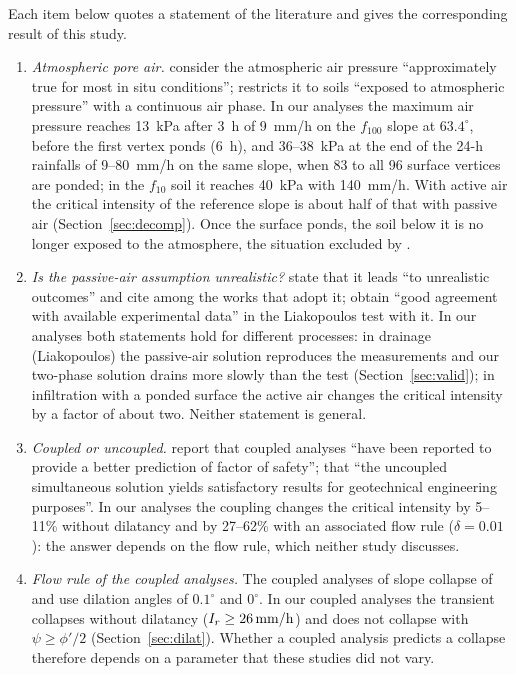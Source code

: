 Each item below quotes a statement of the literature and gives the corresponding result of this study.
\begin{enumerate}
\item \emph{Atmospheric pore air.} \citet[p.~811]{sheng2008} consider the atmospheric air pressure ``approximately
true for most in situ conditions''; \citet[p.~292]{fredlund2006} restricts it to soils ``exposed to atmospheric
pressure'' with a continuous air phase. In our analyses the maximum air pressure reaches 13~kPa after 3~h of
9~mm/h on the $f_{100}$ slope at $63.4^\circ$, before the first vertex ponds (6~h), and 36--38~kPa at the end of the
24-h rainfalls of 9--80~mm/h on the same slope, when 83 to all 96 surface vertices are ponded; in the $f_{10}$ soil it
reaches 40~kPa
with 140~mm/h. With active air the critical intensity of the reference slope is about half of that with passive air
(Section~\ref{sec:decomp}). Once the surface ponds, the soil below it is no longer exposed to the atmosphere, the
situation excluded by \citet{fredlund2006}.

\item \emph{Is the passive-air assumption unrealistic?} \citet[p.~2]{khoei2021} state that it leads ``to unrealistic
outcomes'' and cite \citet{callari2009} among the works that adopt it; \citet[p.~491]{callari2009} obtain ``good
agreement with available experimental data'' in the Liakopoulos test with it. In our analyses both statements hold for
different processes: in drainage (Liakopoulos) the passive-air solution reproduces the measurements and our
two-phase solution drains more slowly than the test (Section~\ref{sec:valid}); in infiltration with a ponded surface
the active air changes the critical intensity by a factor of about two. Neither statement is general.

\item \emph{Coupled or uncoupled.} \citet[p.~2]{pradhan2022} report that coupled analyses ``have been reported to
provide a better prediction of factor of safety''; \citet[p.~315]{fredlund2006} that ``the uncoupled simultaneous
solution yields satisfactory results for geotechnical engineering purposes''. In our analyses the coupling changes
the critical intensity by 5--11\% without dilatancy and by 27--62\% with an associated flow rule
($\delta=0.01$): the answer depends on the flow rule, which neither study discusses.

\item \emph{Flow rule of the coupled analyses.} The coupled analyses of slope collapse of
\citet[p.~6]{wang2018mpm} and \citet[p.~5]{liu2021} use dilation angles of $0.1^\circ$ and $0^\circ$. In our coupled
analyses the transient collapses without dilatancy ($I_r\ge26\,\mathrm{mm/h}$) and does not collapse with $\psi\ge\phi'/2$
(Section~\ref{sec:dilat}). Whether a coupled analysis predicts a collapse therefore depends on a parameter that these
studies did not vary.


\end{enumerate}
